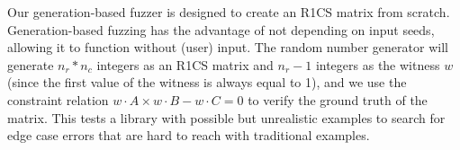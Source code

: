 
Our generation-based fuzzer is designed to create an R1CS matrix from scratch.  Generation-based fuzzing has the advantage of not depending on input seeds, allowing it to function without (user) input.
The random number generator will generate $n_r * n_c$ integers as an R1CS matrix and $n_r - 1$ integers as the witness $w$ (since the first value of the witness is always equal to 1), and we use the constraint relation $w \cdot A \times w \cdot B - w \cdot C = 0$ to verify the ground truth of the matrix. This tests a library with possible but unrealistic examples to search for edge case errors that are hard to reach with traditional examples.



